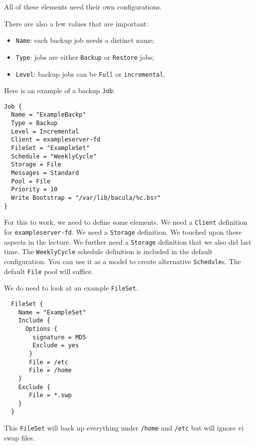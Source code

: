 \documentclass{article}   	%
\begin{document}
All of these elements need their own configurations.

There are also a few values that are important:

\begin{itemize}
	\item \texttt{Name}: each backup job needs a distinct name;
	\item \texttt{Type}: jobs are either \texttt{Backup} or \texttt{Restore} jobs;
	\item \texttt{Level}: backup jobs can be \texttt{Full} or \texttt{incremental}.	
\end{itemize}

Here is an example of a backup \texttt{Job}:

\begin{verbatim}
Job {
  Name = "ExampleBackp"
  Type = Backup
  Level = Incremental
  Client = exampleserver-fd
  FileSet = "ExampleSet"
  Schedule = "WeeklyCycle"
  Storage = File
  Messages = Standard
  Pool = File
  Priority = 10
  Write Bootstrap = "/var/lib/bacula/%c.bsr"
}

\end{verbatim}

For this to work, we need to define some elements. We need a \texttt{Client} definition for \texttt{exampleserver-fd}. We need a \texttt{Storage} definition. We touched upon these aspects in the lecture.  We further need a \texttt{Storage} definition that we also did last time.  The \texttt{WeeklyCycle} schedule definition is included in the default configuration.  You can use it as a model to create alternative \texttt{Schedule}s.
The default \texttt{File} pool will suffice.

We do need to look at an example \texttt{FileSet}.
  
  \begin{verbatim}
  FileSet {
    Name = "ExampleSet"
    Include {
      Options {
        signature = MD5
        Exclude = yes
       }
       File = /etc
       File = /home
    }
    Exclude {
       File = *.swp
    }
  }
  \end{verbatim}
  
This \texttt{FileSet} will back up everything under \texttt{/home} and \texttt{/etc} but will ignore vi swap files.
\end{document}
